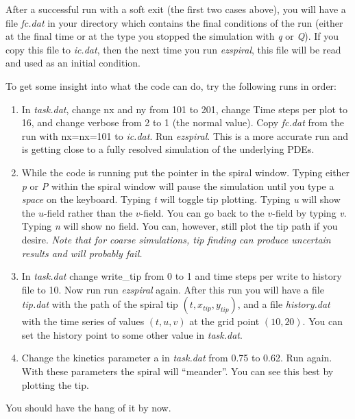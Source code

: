 \documentclass[12pt]{article}
\begin{document}
After a successful run with a soft exit (the first two cases above), you will
have a file {\em fc.dat} in your directory which contains the final conditions
of the run (either at the final time or at the type you stopped the simulation
with {\em q} or {\em Q}). If you copy this file to {\em ic.dat}, then the next
time you run {\em ezspiral}, this file will be read and used as an initial
condition.

To get some insight into what the code can do, try the following runs
in order:
\begin{enumerate}

\item
In {\em task.dat}, change {\sf nx} and {\sf ny} from 101 to 201, change {\sf
Time steps per plot} to 16, and change {\sf verbose} from 2 to 1 (the normal
value). Copy {\em fc.dat} from the run with {\sf nx}={\sf nx}=101 to {\em
ic.dat}. Run {\em ezspiral}.  This is a more accurate run and is getting close
to a fully resolved simulation of the underlying PDEs.

\item
While the code is running put the pointer in the spiral window.  Typing either
{\em p} or {\em P} within the spiral window will pause the simulation until
you type a {\em space} on the keyboard.  Typing {\em t} will toggle tip
plotting.  Typing {\em u} will show the $u$-field rather than the
$v$-field. You can go back to the $v$-field by typing {\em v}.  Typing {\em n}
will show no field. You can, however, still plot the tip path if you desire.
{\em Note that for coarse simulations, tip finding can produce uncertain
results and will probably fail.}

\item
In {\em task.dat} change {\sf write\_tip} from 0 to 1 and {\sf time steps per
write to history file} to 10.  Now run run {\em ezspiral} again.  After this
run you will have a file {\em tip.dat} with the path of the spiral tip $(t,
x_{tip}, y_{tip})$, and a file {\em history.dat} with the time series of
values $(t,u,v)$ at the grid point $(10,20)$.  You can set the history point
to some other value in {\em task.dat}.

\item
Change the kinetics parameter {\sf a} in {\em task.dat} from 0.75 to 0.62.
Run again. With these parameters the spiral will ``meander''. You can see this
best by plotting the tip.  


\end{enumerate}
You should have the hang of it by now.
\end{document}
